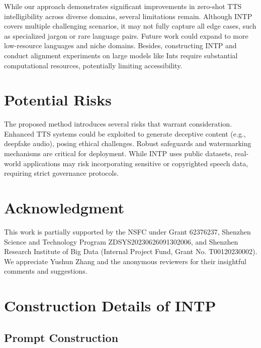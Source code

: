 \documentclass[11pt]{article}
\begin{document}
While our approach demonstrates significant improvements in zero-shot TTS intelligibility across diverse domains, several limitations remain. Although INTP covers multiple challenging scenarios, it may not fully capture all edge cases, such as specialized jargon or rare language pairs. Future work could expand to more low-resource languages and niche domains. Besides, constructing INTP and conduct alignment experiments on large models like Ints require substantial computational resources, potentially limiting accessibility.

\section*{Potential Risks}

The proposed method introduces several risks that warrant consideration. Enhanced TTS systems could be exploited to generate deceptive content (e.g., deepfake audio), posing ethical challenges. Robust safeguards and watermarking mechanisms are critical for deployment. While INTP uses public datasets, real-world applications may risk incorporating sensitive or copyrighted speech data, requiring strict governance protocols.

\section*{Acknowledgment}
This work is partially supported by the NSFC under Grant 62376237, Shenzhen Science and Technology Program ZDSYS20230626091302006, and Shenzhen Research Institute of Big Data (Internal Project Fund, Grant No. T00120230002). We appreciate Yushun Zhang and the anonymous reviewers for their insightful comments and suggestions.

% 


\appendix

\section{Construction Details of INTP}

\subsection{Prompt Construction}
\label{sec:appendix-prompt-construction}
\end{document}
